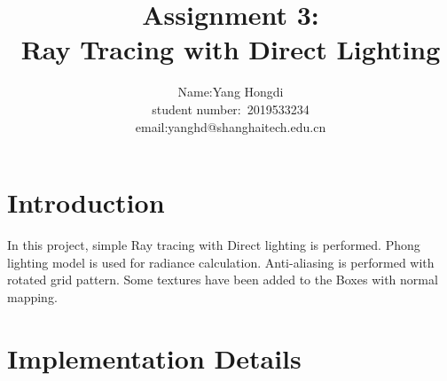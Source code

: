 \documentclass[acmtog]{acmart}
\title{Assignment 3:\\ {Ray Tracing with Direct Lighting}}
\author{Name:\quad Yang Hongdi  \\  student number:\ 2019533234
\\email:\quad yanghd@shanghaitech.edu.cn}
\begin{document}
\maketitle

\vspace*{2 ex}

\section{Introduction}
In this project, simple Ray tracing with Direct lighting is performed. Phong lighting model is used for radiance calculation. Anti-aliasing is performed with rotated grid pattern. 
Some textures have been added to the Boxes with normal mapping.

\section{Implementation Details}
\end{document}
